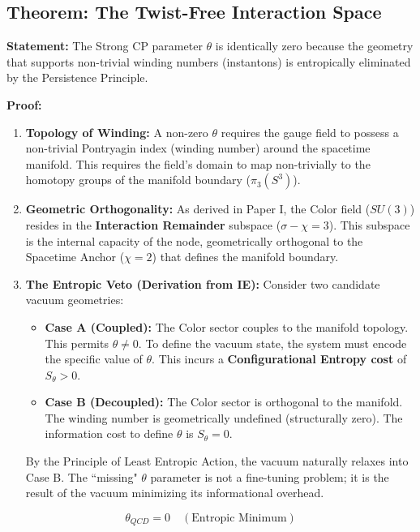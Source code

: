 \subsection{Theorem: The Twist-Free Interaction Space}

\textbf{Statement:} The Strong CP parameter $\theta$ is identically zero because the geometry that supports non-trivial winding numbers (instantons) is entropically eliminated by the Persistence Principle.

\textbf{Proof:}
\begin{enumerate}
    \item \textbf{Topology of Winding:} A non-zero $\theta$ requires the gauge field to possess a non-trivial Pontryagin index (winding number) around the spacetime manifold. This requires the field's domain to map non-trivially to the homotopy groups of the manifold boundary ($\pi_3(S^3)$).
    
    \item \textbf{Geometric Orthogonality:} As derived in Paper I, the Color field ($SU(3)$) resides in the \textbf{Interaction Remainder} subspace ($\sigma - \chi = 3$). This subspace is the internal capacity of the node, geometrically orthogonal to the Spacetime Anchor ($\chi=2$) that defines the manifold boundary.
    
    \item \textbf{The Entropic Veto (Derivation from IE):}
    Consider two candidate vacuum geometries:
    \begin{itemize}
        \item \textbf{Case A (Coupled):} The Color sector couples to the manifold topology. This permits $\theta \neq 0$. To define the vacuum state, the system must encode the specific value of $\theta$. This incurs a \textbf{Configurational Entropy cost} of $S_\theta > 0$.
        \item \textbf{Case B (Decoupled):} The Color sector is orthogonal to the manifold. The winding number is geometrically undefined (structurally zero). The information cost to define $\theta$ is $S_\theta = 0$.
    \end{itemize}
    By the Principle of Least Entropic Action, the vacuum naturally relaxes into Case B. The ``missing" $\theta$ parameter is not a fine-tuning problem; it is the result of the vacuum minimizing its informational overhead.
\end{enumerate}

\begin{equation}
    \theta_{QCD} = 0 \quad (\text{Entropic Minimum})
\end{equation}
